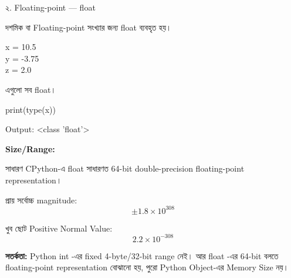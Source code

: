 \begin{minipage}[t]{0.49\linewidth}

\begin{examplebox}{২. Floating-point — \textenglish{\ttfamily float}}

দশমিক বা Floating-point সংখ্যার জন্য
\textenglish{\ttfamily float}
ব্যবহৃত হয়।

\begin{codebox}
\begin{english}
\ttfamily
x = 10.5\\
y = -3.75\\
z = 2.0
\end{english}
\end{codebox}

এগুলো সব
\textenglish{\ttfamily float}।

\begin{codebox}
\begin{english}
\ttfamily
print(type(x))
\end{english}
\end{codebox}

Output:
\textenglish{\ttfamily \textless class 'float'\textgreater}

\medskip

\textbf{Size/Range:}

সাধারণ CPython-এ
\textenglish{\ttfamily float}
সাধারণত 64-bit double-precision floating-point representation।

প্রায় সর্বোচ্চ magnitude:
\[
\pm 1.8\times10^{308}
\]

খুব ছোট Positive Normal Value:
\[
2.2\times10^{-308}
\]

\end{examplebox}

\end{minipage}

\begin{rememberbox}
\textbf{\color{deepOrange}সতর্কতা:}
Python
\textenglish{\ttfamily int}
-এর fixed 4-byte/32-bit range নেই।
আর
\textenglish{\ttfamily float}
-এর 64-bit বলতে floating-point representation বোঝানো হয়,
পুরো Python Object-এর Memory Size নয়।
\end{rememberbox}


